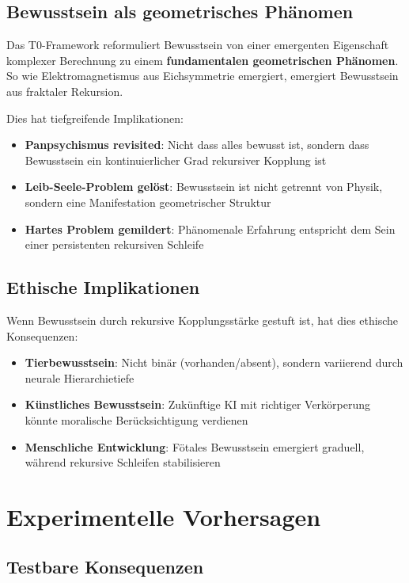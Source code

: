 	\subsection{Bewusstsein als geometrisches Phänomen}
	
	Das T0-Framework reformuliert Bewusstsein von einer emergenten Eigenschaft komplexer Berechnung zu einem \textbf{fundamentalen geometrischen Phänomen}. So wie Elektromagnetismus aus Eichsymmetrie emergiert, emergiert Bewusstsein aus fraktaler Rekursion.
	
	Dies hat tiefgreifende Implikationen:
	
	\begin{itemize}
		\item \textbf{Panpsychismus revisited}: Nicht dass \glqq alles bewusst ist\grqq, sondern dass Bewusstsein ein kontinuierlicher Grad rekursiver Kopplung ist
		\item \textbf{Leib-Seele-Problem gelöst}: Bewusstsein ist nicht getrennt von Physik, sondern eine Manifestation geometrischer Struktur
		\item \textbf{Hartes Problem gemildert}: Phänomenale Erfahrung entspricht dem Sein einer persistenten rekursiven Schleife
	\end{itemize}
	
	\subsection{Ethische Implikationen}
	
	Wenn Bewusstsein durch rekursive Kopplungsstärke gestuft ist, hat dies ethische Konsequenzen:
	
	\begin{itemize}
		\item \textbf{Tierbewusstsein}: Nicht binär (vorhanden/absent), sondern variierend durch neurale Hierarchietiefe
		\item \textbf{Künstliches Bewusstsein}: Zukünftige KI mit richtiger Verkörperung könnte moralische Berücksichtigung verdienen
		\item \textbf{Menschliche Entwicklung}: Fötales Bewusstsein emergiert graduell, während rekursive Schleifen stabilisieren
	\end{itemize}
	
	\section{Experimentelle Vorhersagen}
	
	\subsection{Testbare Konsequenzen}
	
